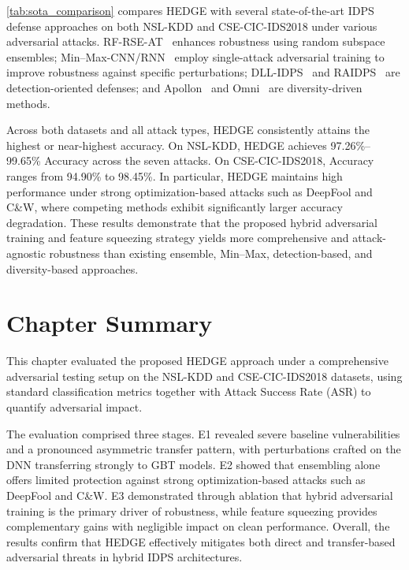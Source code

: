 \documentclass[12pt, a4paper, reqno, oneside]{book}
\begin{document}
\autoref{tab:sota_comparison} compares HEDGE with several state-of-the-art IDPS defense approaches on both NSL-KDD and CSE-CIC-IDS2018 under various adversarial attacks. RF-RSE-AT~\cite{jRF-RSE23} enhances robustness using random subspace ensembles; Min–Max-CNN/RNN~\cite{sota_10556266} employ single-attack adversarial training to improve robustness against specific perturbations; DLL-IDPS~\cite{jDLL-IDS24} and RAIDPS~\cite{jRAIDSdefense23} are detection-oriented defenses; and Apollon~\cite{jAPOLLONpaya24} and Omni~\cite{mSOTA320} are diversity-driven methods.

Across both datasets and all attack types, HEDGE consistently attains the highest or near-highest accuracy. On NSL-KDD, HEDGE achieves 97.26\%--99.65\% Accuracy across the seven attacks. On CSE-CIC-IDS2018, Accuracy ranges from 94.90\% to 98.45\%. In particular, HEDGE maintains high performance under strong optimization-based attacks such as DeepFool and C\&W, where competing methods exhibit significantly larger accuracy degradation. These results demonstrate that the proposed hybrid adversarial training and feature squeezing strategy yields more comprehensive and attack-agnostic robustness than existing ensemble, Min–Max, detection-based, and diversity-based approaches.


\section{Chapter Summary}

This chapter evaluated the proposed HEDGE approach under a comprehensive adversarial testing setup on the NSL-KDD and CSE-CIC-IDS2018 datasets, using standard classification metrics together with Attack Success Rate (ASR) to quantify adversarial impact.

The evaluation comprised three stages. E1 revealed severe baseline vulnerabilities and a pronounced asymmetric transfer pattern, with perturbations crafted on the DNN transferring strongly to GBT models. E2 showed that ensembling alone offers limited protection against strong optimization-based attacks such as DeepFool and C\&W. E3 demonstrated through ablation that hybrid adversarial training is the primary driver of robustness, while feature squeezing provides complementary gains with negligible impact on clean performance. Overall, the results confirm that HEDGE effectively mitigates both direct and transfer-based adversarial threats in hybrid IDPS architectures.
\end{document}
